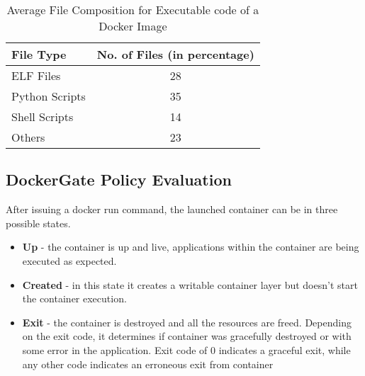 \begin{table}[b]
\centering
\begin{tabular}{|l|c|}
\hline
\textbf{File Type} & \textbf{No. of Files (in percentage)} \\ \hline
ELF Files          & 28                                    \\ \hline
Python Scripts     & 35                                    \\ \hline
Shell Scripts      & 14                                    \\ \hline
Others             & 23                                    \\ \hline
\end{tabular}
\caption{Average File Composition for Executable code of a Docker Image}
\label{filecompose}
\end{table}





\subsection{DockerGate Policy Evaluation}



After issuing a docker run command, the launched container can be in three possible states. 
\begin{itemize}
\item \textbf{Up} - the container is up and live, applications within the container are being executed as expected.
\item \textbf{Created} - in this state it creates a writable container layer but doesn’t start the container execution.
\item \textbf{Exit} - the container is destroyed and all the resources are freed. Depending on the exit code, it determines if container was gracefully destroyed or with some error in the application. Exit code of 0 indicates a graceful exit, while any other code indicates an erroneous exit from container
\end{itemize}

